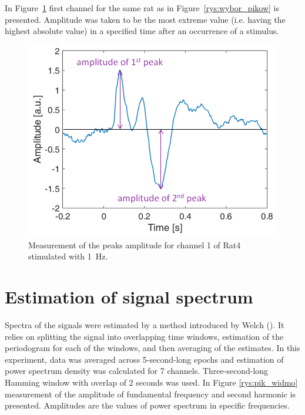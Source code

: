 \documentclass{pracalicmgr}
\begin{document}
   In Figure~\ref{rys:amplitude} first channel for the same rat as in Figure~\ref{rys:wybor_pikow} is presented. Amplitude was taken to be the most extreme value (i.e. having the highest absolute value) in a specified time after an occurrence of a stimulus.
   \begin{figure}[H]
   	\begin{center}
   		\includegraphics[scale=0.5]{amplitude2.png}
   	\end{center}
   	\caption{Measurement of the peaks amplitude for channel 1 of Rat4 stimulated with 1~Hz. }
   	\label{rys:amplitude}
   \end{figure} 
   
   
   \section{Estimation of signal spectrum}
   Spectra of the signals were estimated by a method introduced by Welch (\cite{welch}). It relies  on splitting the signal into overlapping time windows, estimation of the periodogram for each of the windows, and then averaging of the estimates. In this experiment, data was averaged across 5-second-long epochs and estimation of power spectrum density was calculated for 7 channels. Three-second-long Hamming window with overlap of 2 seconds was used. In Figure \ref{rys:pik_widmo} measurement of the amplitude of fundamental frequency and second harmonic is presented. Amplitudes are the values of power spectrum in specific frequencies. 
   
\end{document}

